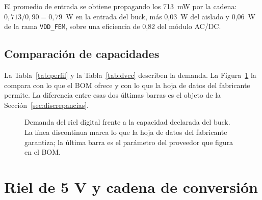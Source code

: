 \documentclass[11pt,a4paper]{article}
\begin{document}
\noindent El promedio de entrada se obtiene propagando los 713~mW por la cadena:
$0{,}713/0{,}90 = 0{,}79$~W en la entrada del buck, más 0,03~W del aislado y
0,06~W de la rama \texttt{VDD\_FEM}, sobre una eficiencia de 0,82 del módulo
AC/DC.

\subsection{Comparación de capacidades}

La Tabla~\ref{tab:perfil} y la Tabla~\ref{tab:dvcc} describen la demanda. La
Figura~\ref{fig:carga} la compara con lo que el BOM ofrece y con lo que la hoja
de datos del fabricante permite. La diferencia entre esas dos últimas barras es
el objeto de la Sección~\ref{sec:discrepancias}.

\begin{figure}[H]
\centering
{}
\caption{Demanda del riel digital frente a la capacidad declarada del buck. La
línea discontinua marca lo que la hoja de datos del fabricante garantiza; la
última barra es el parámetro del proveedor que figura en el BOM.}
\label{fig:carga}
\end{figure}

\section{Riel de 5 V y cadena de conversión}
\label{sec:riel5}
\end{document}

